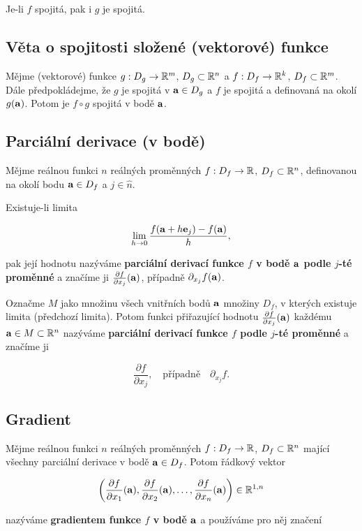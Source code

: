 Je-li $f$ spojitá, pak i $g$ je spojitá.

\subsection*{Věta o spojitosti složené (vektorové) funkce}

Mějme (vektorové) funkce $g: D_g \to \mathbb{R}^m$, $D_g \subset \mathbb{R}^n$ a $f: D_f \to
    \mathbb{R}^k$, $D_f \subset \mathbb{R}^m$. Dále předpokládejme, že $g$ je spojitá v $\mathbf{a} \in
    D_g$ a $f$ je spojitá a definovaná na okolí $g(\mathbf{a})$. Potom je $f \circ g$
spojitá v bodě $\mathbf{a}$.

\subsection*{Parciální derivace (v bodě)}

Mějme reálnou funkci $n$ reálných proměnných $f: D_f \to \mathbb{R}$, $D_f \subset
    \mathbb{R}^n$, definovanou na okolí bodu $\mathbf{a} \in D_f$ a $j \in \hat n$.

Existuje-li limita

\[ \lim_{h \to 0} \frac{f(\mathbf{a} + h \mathbf{e}_j) - f(\mathbf{a})}{h}, \]

pak její hodnotu nazýváme \textbf{parciální derivací funkce $f$ v bodě $\mathbf{a}$
    podle $j$-té proměnné} a značíme ji $\frac{\partial f}{\partial x_j}(\mathbf{a})$, případně $\partial_{x_j} f(\mathbf{a})$.

Označme $M$ jako množinu všech vnitřních bodů $\mathbf{a}$ množiny $D_f$, v kterých
existuje limita (předchozí limita). Potom funkci přiřazující hodnotu $\frac{\partial{f}}{\partial x_j}(\mathbf{a})$ každému $\mathbf{a} \in M\subset\mathbb{R}^n$ nazýváme \textbf{parciální
    derivací funkce $f$ podle $j$-té proměnné} a značíme ji

\[ \frac{\partial f}{\partial x_j}, \quad \text{případně} \quad \partial_{x_j} f. \]

\subsection*{Gradient}

Mějme reálnou funkci $n$ reálných proměnných $f: D_f \to \mathbb{R}$, $D_f \subset
    \mathbb{R}^n$ mající všechny parciální derivace v bodě $\mathbf{a} \in D_f$. Potom řádkový
vektor

\[ \left( \frac{\partial f}{\partial x_1}(\mathbf{a}), \frac{\partial f}{\partial x_2}(\mathbf{a}), \ldots, \frac{\partial f}{\partial x_n}(\mathbf{a}) \right) \in \mathbb{R}^{1,n} \]

\noindent nazýváme \textbf{gradientem funkce $f$ v bodě $\mathbf{a}$} a používáme pro něj značení

